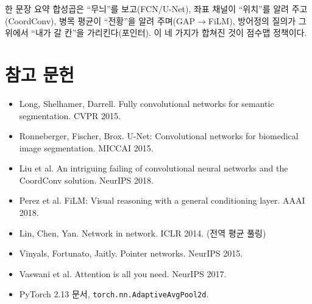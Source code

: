 \documentclass[11pt]{article}
\begin{document}
\bigskip
\begin{keybox}{한 문장 요약}
합성곱은 ``무늬''를 보고(FCN/U-Net), 좌표 채널이 ``위치''를 알려 주고(CoordConv), 병목 평균이 ``전황''을
알려 주며(GAP$\to$FiLM), 방어정의 질의가 그 위에서 ``내가 갈 칸''을 가리킨다(포인터). 이 네 가지가 합쳐진
것이 점수맵 정책이다.
\end{keybox}

\section*{참고 문헌}
\begin{itemize}[leftmargin=*, itemsep=1pt, label={--}]
\item Long, Shelhamer, Darrell. Fully convolutional networks for semantic segmentation. CVPR 2015.
\item Ronneberger, Fischer, Brox. U-Net: Convolutional networks for biomedical image segmentation. MICCAI 2015.
\item Liu et al. An intriguing failing of convolutional neural networks and the CoordConv solution. NeurIPS 2018.
\item Perez et al. FiLM: Visual reasoning with a general conditioning layer. AAAI 2018.
\item Lin, Chen, Yan. Network in network. ICLR 2014. (전역 평균 풀링)
\item Vinyals, Fortunato, Jaitly. Pointer networks. NeurIPS 2015.
\item Vaswani et al. Attention is all you need. NeurIPS 2017.
\item PyTorch 2.13 문서, \texttt{torch.nn.AdaptiveAvgPool2d}.
\end{itemize}
\end{document}
